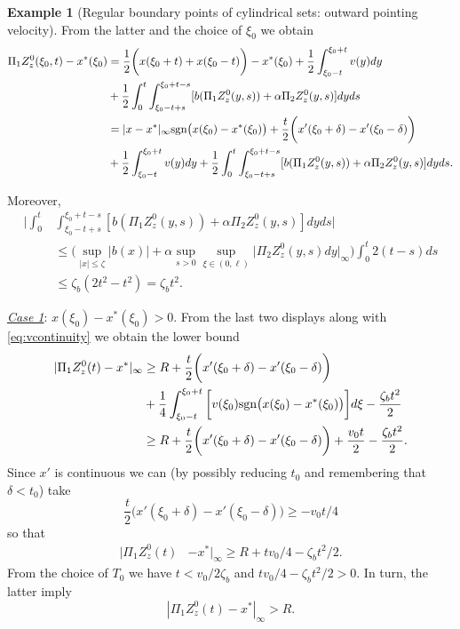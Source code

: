 \documentclass[10pt, reqno]{amsart}
\theoremstyle{definition}
\newtheorem{example}{Example}
\numberwithin{lem}{section}
\numberwithin{cor}{section}
\numberwithin{prop}{section}
\numberwithin{thm}{section}
\numberwithin{dfn}{section}
\begin{document}
\begin{example}[Regular boundary points of cylindrical sets: outward pointing velocity]
\noindent From the latter and the choice of $\xi_0$ we obtain 
\begin{equation*}
\begin{aligned}
     \Pi_1Z^0_z(\xi_0,t)-x^*(\xi_0)&=\frac{1}{2}\bigg(x(\xi_0+t) + x(\xi_0-t)    \bigg)-x^*(\xi_0)+\frac{1}{2}  \int_{\xi_0-t}^{\xi_0+t}v(y)dy\\&+\frac{1}{2}\int_0^{t}\int_{\xi_0-t+s}^{\xi_0+t-s}[b(\Pi_1Z^0_z(y, s))+\alpha\Pi_2Z^0_z(y,s)]dyds \\&=   |x-x^*|_\infty\textnormal{sgn}\big(x(\xi_0)-x^*(\xi_0)\big)+\frac{t}{2}\bigg(x'(\xi_0+\delta)-x'(\xi_0-\delta) \bigg)                    \\&+\frac{1}{2}  \int_{\xi_0-t}^{\xi_0+t}v(y)dy+\frac{1}{2}\int_0^{t}\int_{\xi_0-t+s}^{\xi_0+t-s}[b(\Pi_1Z^0_z(y, s))+\alpha\Pi_2Z^0_z(y,s)]dyds.
\end{aligned}
\end{equation*}


Moreover, 
\begin{equation*}\label{eq:zetabbnd}
    \begin{aligned}
        \bigg|\int_0^{t}&\int_{\xi_0-t+s}^{\xi_0+t-s}[b(\Pi_1Z^0_z(y, s))+\alpha\Pi_2Z^0_z(y,s)]dyds\bigg|\\&\leq \bigg(\sup_{|x|\leq \zeta}|b(x)|+\alpha\sup_{ s>0}\sup_{\xi\in(0,\ell)}\big|\Pi_2Z^0_z(y,s)dy\big|_{\infty}   \bigg)\int_{0}^{t} 2(t-s)ds\\&\leq \zeta_b(2t^2-t^2)
        =\zeta_bt^2.
    \end{aligned}
\end{equation*} 







\noindent\underline{\textit{Case 1}}:  $x(\xi_0)-x^*(\xi_0)>0.$ From the last two displays along with \eqref{eq:vcontinuity} we obtain the lower bound
\begin{equation*}
\begin{aligned}
     |\Pi_1Z^0_z(t)-x^*|_{\infty}&\geq  R+\frac{t}{2}\bigg(x'(\xi_0+\delta) -x'(\xi_0-\delta) \bigg)\\&+\frac{1}{4}\int_{\xi_0-t}^{\xi_0+t}\bigg[v(\xi_0)\textnormal{sgn}\big(x(\xi_0)-x^*(\xi_0)\big)\bigg]d\xi-\frac{\zeta_b t^2}{2}\\&\geq 
     R+\frac{t}{2}\bigg(x'(\xi_0+\delta) -x'(\xi_0-\delta) \bigg)+\frac{v_0 t}{2}-\frac{\zeta_b t^2}{2}.
\end{aligned}
\end{equation*}
Since $x'$ is continuous we can (by possibly reducing $t_0$ and remembering that $\delta<t_0$) take 
$$\frac{t}{2}\bigg(x'(\xi_0+\delta)-x'(\xi_0-\delta)\bigg)\geq -v_0t/4    $$
so that
\begin{equation*}
\begin{aligned}
     |\Pi_1Z^0_z(t)&-x^*|_{\infty}\geq  R+tv_0/4- \zeta_bt^2/2. 
\end{aligned}
\end{equation*}
From the choice of $T_0$ we have $t<v_0/2\zeta_b$ and
$tv_0/4-\zeta_bt^2/2>0.$ In turn, the latter imply 
$$|\Pi_1Z^0_z(t)-x^*|_{\infty}>R.$$


\end{example}
\end{document}
